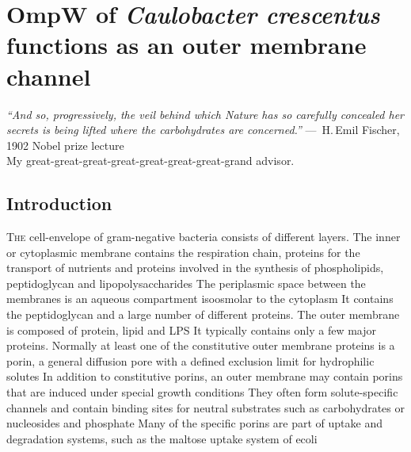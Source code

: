 \acresetall

\chapter{OmpW of \textit{Caulobacter crescentus} functions as an outer membrane channel}
\label{ch:porin}
\begin{epigraph}
  \emph{``And so, progressively, the veil behind which Nature has so carefully concealed her secrets is being lifted where the carbohydrates are concerned.''} ---~H.\,Emil Fischer, 1902 Nobel prize lecture\\ My great-great-great-great-great-great-great-grand advisor.
\end{epigraph}
\section{Introduction} %
\label{sec:porin_introduction} 
\lettrine[lines=2]{T}{he} cell-envelope of gram-negative bacteria consists of different layers. The inner or cytoplasmic membrane contains the respiration chain, proteins for the transport of nutrients and proteins involved in the synthesis of phospholipids, peptidoglycan and lipopolysaccharides  The periplasmic space between the membranes is an aqueous compartment isoosmolar to the cytoplasm  It contains the peptidoglycan and a large number of different proteins. The outer membrane is composed of protein, lipid and \ac{LPS}  It typically contains only a few major proteins. Normally at least one of the constitutive outer membrane proteins is a porin, a general diffusion pore with a defined exclusion limit for hydrophilic solutes  In addition to constitutive porins, an outer membrane may contain porins that are induced under special growth conditions They often form solute-specific channels and contain binding sites for neutral substrates such as carbohydrates or nucleosides and phosphate Many of the specific porins are part of uptake and degradation systems, such as the maltose uptake system of \ac{ecoli} 

